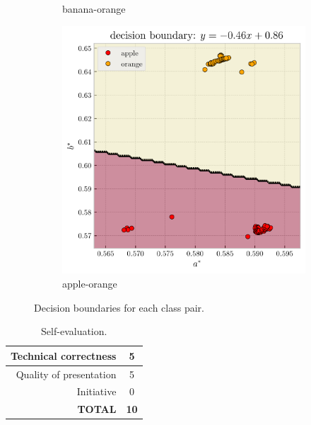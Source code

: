 \documentclass[12pt,a4paper]{article}
\begin{document}
\begin{figure}[htb]
\begin{subfigure}[h!]{0.3\textwidth}
		\caption{banana-orange}
		\label{fig:banana-orange}
	\end{subfigure}
	\begin{subfigure}[h!]{0.3\textwidth}
		\centering
		\includegraphics[width=\textwidth]{app-ora_decision.png}
		\caption{apple-orange}
		\label{fig:apple-orange}
	\end{subfigure}
	\caption{Decision boundaries for each class pair.}
	\label{fig:boundaries}
\end{figure}

\begin{table}[!htb]
	\centering
	\caption{Self-evaluation.}
	\begin{tabular}{||r|c||}
		\hline
		Technical correctness & 5 \\ \hline
		Quality of presentation & 5 \\ \hline
		Initiative & 0 \\ \hline
		\textbf{TOTAL} & \textbf{10} \\ \hline
	\end{tabular}
	\label{tab:self-eval}
\end{table}



\end{document}
